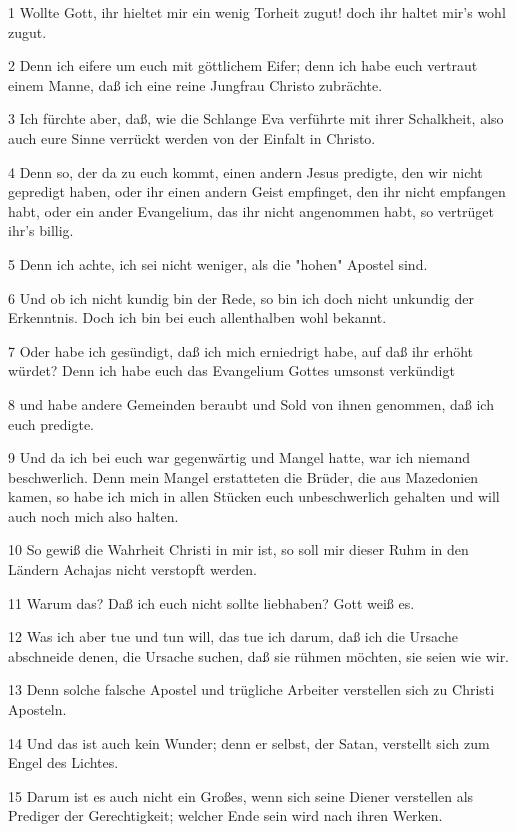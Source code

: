 \par 1 Wollte Gott, ihr hieltet mir ein wenig Torheit zugut! doch ihr haltet mir's wohl zugut.
\par 2 Denn ich eifere um euch mit göttlichem Eifer; denn ich habe euch vertraut einem Manne, daß ich eine reine Jungfrau Christo zubrächte.
\par 3 Ich fürchte aber, daß, wie die Schlange Eva verführte mit ihrer Schalkheit, also auch eure Sinne verrückt werden von der Einfalt in Christo.
\par 4 Denn so, der da zu euch kommt, einen andern Jesus predigte, den wir nicht gepredigt haben, oder ihr einen andern Geist empfinget, den ihr nicht empfangen habt, oder ein ander Evangelium, das ihr nicht angenommen habt, so vertrüget ihr's billig.
\par 5 Denn ich achte, ich sei nicht weniger, als die "hohen" Apostel sind.
\par 6 Und ob ich nicht kundig bin der Rede, so bin ich doch nicht unkundig der Erkenntnis. Doch ich bin bei euch allenthalben wohl bekannt.
\par 7 Oder habe ich gesündigt, daß ich mich erniedrigt habe, auf daß ihr erhöht würdet? Denn ich habe euch das Evangelium Gottes umsonst verkündigt
\par 8 und habe andere Gemeinden beraubt und Sold von ihnen genommen, daß ich euch predigte.
\par 9 Und da ich bei euch war gegenwärtig und Mangel hatte, war ich niemand beschwerlich. Denn mein Mangel erstatteten die Brüder, die aus Mazedonien kamen, so habe ich mich in allen Stücken euch unbeschwerlich gehalten und will auch noch mich also halten.
\par 10 So gewiß die Wahrheit Christi in mir ist, so soll mir dieser Ruhm in den Ländern Achajas nicht verstopft werden.
\par 11 Warum das? Daß ich euch nicht sollte liebhaben? Gott weiß es.
\par 12 Was ich aber tue und tun will, das tue ich darum, daß ich die Ursache abschneide denen, die Ursache suchen, daß sie rühmen möchten, sie seien wie wir.
\par 13 Denn solche falsche Apostel und trügliche Arbeiter verstellen sich zu Christi Aposteln.
\par 14 Und das ist auch kein Wunder; denn er selbst, der Satan, verstellt sich zum Engel des Lichtes.
\par 15 Darum ist es auch nicht ein Großes, wenn sich seine Diener verstellen als Prediger der Gerechtigkeit; welcher Ende sein wird nach ihren Werken.
